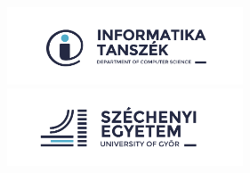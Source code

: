 \hypersetup{pageanchor=false}
\begin{titlepage}
\begin{center}

\begin{figure}[!htb]
	\begin{minipage}{0.48\textwidth}
	  \centering
	  \hspace{-2cm}\includegraphics[width=70mm,keepaspectratio]{figures/infologo_2020_department.png}
	\end{minipage}\hfill
	\begin{minipage}{0.48\textwidth}
	  \centering
	  \hspace{-2cm}\includegraphics[width=70mm,keepaspectratio]{figures/infologo_2020_university.png}
	\end{minipage}
 \end{figure}
 

\vspace{120pt} %
{\Huge \bfseries \MakeUppercase {\doktipus}}\\
\vspace{68pt}
{\huge \bfseries \cim}\\
\vspace{68pt}
{\huge \bfseries{\szerzo}}

\vspace{90pt}
\Large \textbf{\szak{}}\\
\textbf{\szakirany}\\
\vspace{90pt}
{\Large \textbf{\the\year}}

\vfill

\end{center}
\end{titlepage}
\hypersetup{pageanchor=false}
